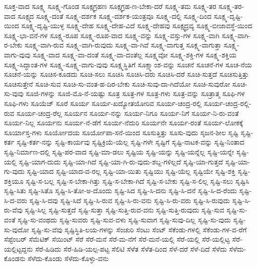 {ಸೂಕ್ತ-ವಾದ
ಸೂಕ್ಷ್ಮ
ಸೂಕ್ಷ್ಮ-ಗೊಂಡ
ಸೂಕ್ಷ್ಮಗ್ರಹಣ
ಸೂಕ್ಷ್ಮಗ್ರಹ-ಣ-ಬೇಕಾ-ದರೆ
ಸೂಕ್ಷ್ಮ-ತಮ
ಸೂಕ್ಷ್ಮ-ತರ
ಸೂಕ್ಷ್ಮ-ತರ-ವಾದ
ಸೂಕ್ಷ್ಮದ
ಸೂಕ್ಷ್ಮ-ದಂತೆ
ಸೂಕ್ಷ್ಮ-ದರ್ಶಕ
ಸೂಕ್ಷ್ಮ-ದರ್ಶಕ-ಯಂತ್ರವೂ
ಸೂಕ್ಷ್ಮ-ದಲ್ಲಿ
ಸೂಕ್ಷ್ಮ-ದಿಂದ
ಸೂಕ್ಷ್ಮ-ದೃಷ್ಟಿ-ಯಿಂದ
ಸೂಕ್ಷ್ಮ-ದೃಷ್ಟಿ-ಯುಳ್ಳ
ಸೂಕ್ಷ್ಮ-ದೇಹ
ಸೂಕ್ಷ್ಮ-ದೇಹ-ವಿದೆ
ಸೂಕ್ಷ್ಮ-ದೇಹವು
ಸೂಕ್ಷ್ಮದ್ರವ್ಯ
ಸೂಕ್ಷ್ಮ-ಬೀಜಾವಸ್ಥೆ-ಯಿಂದ
ಸೂಕ್ಷ್ಮ-ಭಾ-ವನೆ-ಗಳ
ಸೂಕ್ಷ್ಮ-ರೂಪ
ಸೂಕ್ಷ್ಮ-ರೂಪ-ವಾದ
ಸೂಕ್ಷ್ಮ-ವನ್ನು
ಸೂಕ್ಷ್ಮ-ವಸ್ತು-ಗಳ
ಸೂಕ್ಷ್ಮ-ವಾಗಿ
ಸೂಕ್ಷ್ಮ-ವಾಗಿ-ರ-ಬೇಕು
ಸೂಕ್ಷ್ಮ-ವಾಗಿ-ರುವ
ಸೂಕ್ಷ್ಮ-ವಾಗಿ-ರುವುದು
ಸೂಕ್ಷ್ಮ-ವಾ-ಗಿವೆ
ಸೂಕ್ಷ್ಮ-ವಾಗುತ್ತ
ಸೂಕ್ಷ್ಮ-ವಾಗುತ್ತಾ
ಸೂಕ್ಷ್ಮ-ವಾಗು-ವುವು
ಸೂಕ್ಷ್ಮ-ವಾದ
ಸೂಕ್ಷ್ಮ-ವಾ-ದಂತೆ
ಸೂಕ್ಷ್ಮ-ವಾ-ದಂತೆಲ್ಲ
ಸೂಕ್ಷ್ಮವೋ
ಸೂಕ್ಷ್ಮ-ಶಕ್ತಿ-ಗಳ
ಸೂಕ್ಷ್ಮ-ಶಕ್ತಿಯ
ಸೂಕ್ಷ್ಮ-ಸಿದ್ಧಾಂತ-ಗಳ
ಸೂಕ್ಷ್ಮ-ಸೂಕ್ಷ್ಮ-ವಾಗು-ವುವು
ಸೂಕ್ಷ್ಮಸ್ಥಿತಿಗೆ
ಸೂಕ್ಷ್ಮಾಂಶ-ವನ್ನು
ಸೂಚನೆ
ಸೂಚನೆ-ಗಳ
ಸೂಚ-ನೆಯ
ಸೂಚನೆ-ಯನ್ನು
ಸೂಚಿಸ-ಕೂಡದು
ಸೂಚಿ-ಸಲು
ಸೂಚಿಸಿ
ಸೂಚಿಸಿ-ದರು
ಸೂಚಿಸಿ-ದರೆ
ಸೂಚಿ-ಸುತ್ತದೆ
ಸೂಚಿಸುತ್ತಿತ್ತು
ಸೂಚಿಸುತ್ತೇನೆ
ಸೂಚಿ-ಸುವ
ಸೂಚಿ-ಸು-ವಂತ-ಹ-ದಿರ-ಬೇಕು
ಸೂಚಿ-ಸುವು-ದಾ-ಗಿದೆಯೋ
ಸೂಚಿ-ಸುವುರೋ
ಸೂಚಿ-ಸು-ವುವು
ಸೂಜಿ-ಗಳನ್ನು
ಸೂಜಿ-ಮೊ-ನೆ-ಯಷ್ಟು
ಸೂತ್ರ
ಸೂತ್ರ-ಗಳ
ಸೂತ್ರ-ಗಳು
ಸೂತ್ರ-ವನ್ನು
ಸೂತ್ರಾತ್ಮ
ಸೂಫಿ-ಗಳ
ಸೂಫಿ-ಗಳು
ಸೂಯೆಜ್
ಸೂರೆ
ಸೂರ್ಯ
ಸೂರ್ಯ-ಖದ್ಯೋತಯೋರಿವ
ಸೂರ್ಯ-ಚಂದ್ರ-ರಲ್ಲಿ
ಸೂರ್ಯ-ಚಂದ್ರ-ರಲ್ಲಿ-ರುವ
ಸೂರ್ಯ-ಚಂದ್ರ-ರೆಲ್ಲ
ಸೂರ್ಯನ
ಸೂರ್ಯ-ನನ್ನು
ಸೂರ್ಯ-ನಿಗೂ
ಸೂರ್ಯ-ನಿಗೆ
ಸೂರ್ಯ-ನಿ-ರು-ವಂತೆ
ಸೂರ್ಯ-ನಿಲ್ಲ
ಸೂರ್ಯನು
ಸೂರ್ಯ-ನೆ-ಡೆಗೆ
ಸೂರ್ಯ-ನೆದುರಿ
ಸೂರ್ಯನೇ
ಸೂರ್ಯ-ರಂತೆ
ಸೂರ್ಯ-ಲೋಕಕ್ಕೆ
ಸೂರ್ಯಾಸ್ತ-ಗಳು
ಸೂರ್ಯೋದಯ
ಸೂರ್ಯೋಪಾ-ಸನೆ-ಯಿಂದ
ಸೂಸುತ್ತಿತ್ತು
ಸೂಸು-ವುದು
ಸೃಜನ-ಶೀಲ
ಸೃಷ್ಟಿ
ಸೃಷ್ಟಿ-ಕರ್ತ
ಸೃಷ್ಟಿ-ಕರ್ತ-ನನ್ನು
ಸೃಷ್ಟಿ-ಕಾರ್ಯವು
ಸೃಷ್ಟಿಕ್ರಿಯೆ-ಯೆಲ್ಲ
ಸೃಷ್ಟಿ-ಗಳೇ
ಸೃಷ್ಟಿಗೆ
ಸೃಷ್ಟಿ-ನಾಟಕ-ವನ್ನು
ಸೃಷ್ಟಿ-ನಿಂತಾದ
ಸೃಷ್ಟಿ-ನಿರ್ಮಾಣ-ದಲ್ಲಿ
ಸೃಷ್ಟಿ-ಪರ-ವಾದ
ಸೃಷ್ಟಿ-ಮಾ-ಡಲು
ಸೃಷ್ಟಿಯ
ಸೃಷ್ಟಿ-ಯನ್ನು
ಸೃಷ್ಟಿ-ಯನ್ನೆಲ್ಲ
ಸೃಷ್ಟಿ-ಯನ್ನೇ
ಸೃಷ್ಟಿ-ಯಲ್ಲಿ
ಸೃಷ್ಟಿ-ಯಾಗ-ದುದು
ಸೃಷ್ಟಿ-ಯಾ-ಗಿದೆ
ಸೃಷ್ಟಿ-ಯಾ-ಗಿ-ರು-ವುದು-ಶಬ್ದ-ಗಳಿಲ್ಲದೆ
ಸೃಷ್ಟಿ-ಯಾ-ಗುತ್ತದೆ
ಸೃಷ್ಟಿ-ಯಾ-ಗು-ವುದು
ಸೃಷ್ಟಿ-ಯಾದ
ಸೃಷ್ಟಿ-ಯಾದ-ವ-ರಲ್ಲ
ಸೃಷ್ಟಿ-ಯಾ-ಯಿತು
ಸೃಷ್ಟಿಯು
ಸೃಷ್ಟಿ-ಯೆಲ್ಲ
ಸೃಷ್ಟಿಯೇ
ಸೃಷ್ಟಿ-ಶಕ್ತಿ
ಸೃಷ್ಟಿ-ಶಕ್ತಿಯೂ
ಸೃಷ್ಟಿ-ಸ-ಬಲ್ಲ
ಸೃಷ್ಟಿ-ಸ-ಬೇಕಾ-ಗಿತ್ತು
ಸೃಷ್ಟಿ-ಸ-ಬೇಕಾ-ಗಿದೆ
ಸೃಷ್ಟಿ-ಸ-ಬೇಕು
ಸೃಷ್ಟಿ-ಸ-ಲಿಲ್ಲ
ಸೃಷ್ಟಿ-ಸಲು
ಸೃಷ್ಟಿಸಿ
ಸೃಷ್ಟಿ-ಸಿತು
ಸೃಷ್ಟಿ-ಸಿತೊ
ಸೃಷ್ಟಿ-ಸಿ-ತೋ-ಅ-ದೊಂದು
ಸೃಷ್ಟಿ-ಸಿದ
ಸೃಷ್ಟಿ-ಸಿ-ದನು
ಸೃಷ್ಟಿ-ಸಿ-ದನೆ
ಸೃಷ್ಟಿ-ಸಿ-ದ-ರೆಂದು
ಸೃಷ್ಟಿ-ಸಿ-ದ-ವರು
ಸೃಷ್ಟಿ-ಸಿ-ದವು
ಸೃಷ್ಟಿ-ಸಿದೆ
ಸೃಷ್ಟಿ-ಸಿ-ರುವ
ಸೃಷ್ಟಿ-ಸಿ-ರು-ವನು
ಸೃಷ್ಟಿ-ಸಿ-ರು-ವರು
ಸೃಷ್ಟಿ-ಸಿ-ರುವುದು
ಸೃಷ್ಟಿ-ಸಿ-ರು-ವೆವು
ಸೃಷ್ಟಿ-ಸಿಲ್ಲ
ಸೃಷ್ಟಿ-ಸುತ್ತದೆ
ಸೃಷ್ಟಿ-ಸುತ್ತಾ
ಸೃಷ್ಟಿ-ಸುತ್ತಿ-ರುವ-ವನು
ಸೃಷ್ಟಿ-ಸುತ್ತಿ-ರುವುದು
ಸೃಷ್ಟಿ-ಸುವ
ಸೃಷ್ಟಿ-ಸು-ವಂತೆ
ಸೃಷ್ಟಿ-ಸು-ವಂಥದು
ಸೃಷ್ಟಿ-ಸುವರು
ಸೃಷ್ಟಿ-ಸುವ-ವಳು
ಸೃಷ್ಟಿ-ಸುವಾಗ
ಸೃಷ್ಟಿ-ಸುವು-ದಿಲ್ಲ
ಸೃಷ್ಟಿ-ಸು-ವುದು
ಸೃಷ್ಟಿ-ಸು-ವುದೋ
ಸೃಷ್ಟಿ-ಸು-ವೆವು
ಸೃಷ್ಟಿಸ್ಥಿತಿ-ಲಯ-ಗಳನ್ನು
ಸೆಂಚುರಿ
ಸೆಂಟು
ಸೆಂಟ್
ಸೆಕೆಂಡು-ಗಳಲ್ಲಿ
ಸೆಕೆಂಡು-ಗಳ-ವ-ರೆಗೆ
ಸೆಪ್ಟೆಂಬರ್
ಸೆಮೆಟಿಕ್
ಸೆಯಿಂಟ್
ಸೆರೆ
ಸೆರೆ-ಮನೆ
ಸೆರೆ-ಮ-ನೆಗೆ
ಸೆರೆ-ಮನೆ-ಯಲ್ಲಿ
ಸೆರೆ-ಯಲ್ಲಿ
ಸೆರೆ-ಯಲ್ಲಿಟ್ಟ
ಸೆರೆ-ಯಲ್ಲಿಟ್ಟದ್ದನು
ಸೆರೆ-ಹಿಡಿದು
ಸೆರೆ-ಹಿಡಿ-ಯಲ್ಪ-ಪಟ್ಟ
ಸೆಲಿಟಿ
ಸೆಳೆತ
ಸೆಳೆತ-ದಿಂದ
ಸೆಳೆ-ದರೆ
ಸೆಳೆ-ದಿದೆ
ಸೆಳೆದು
ಸೆಳೆದು-ಕೊಂಡನು
ಸೆಳೆದು-ಕೊಂಡು
ಸೆಳೆದು-ಕೊಳ್ಳು-ವನು
}
